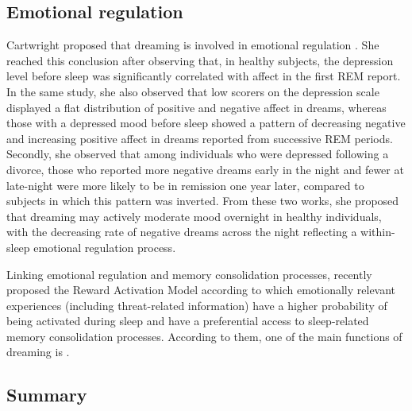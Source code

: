 \subsection{Emotional regulation}
\label{sec:dream-func:modern:emotion}

Cartwright proposed that dreaming is involved in emotional regulation \citep{cartwright_role_1998, cartwright_role_1998-1}. She reached this conclusion after observing that, in healthy subjects, the depression level before sleep was significantly correlated with affect in the first REM report. In the same study, she also observed that low scorers on the depression scale displayed a flat distribution of positive and negative affect in dreams, whereas those with a depressed mood before sleep showed a pattern of decreasing negative and increasing positive affect in dreams reported from successive REM periods. Secondly, she observed that among individuals who were depressed following a divorce, those who reported more negative dreams early in the night and fewer at late-night were more likely to be in remission one year later, compared to subjects in which this pattern was inverted. From these two works, she proposed that dreaming may actively moderate mood overnight in healthy individuals, with the decreasing rate of negative dreams across the night reflecting a within-sleep emotional regulation process.

Linking emotional regulation and memory consolidation processes, \citet{perogamvros_roles_2012} recently proposed the Reward Activation Model according to which emotionally relevant experiences (including threat-related information) have a higher probability of being activated during sleep and have a preferential access to sleep-related memory consolidation processes. According to them, one of the main functions of dreaming is  \citep{meerlo_sleep_2013}.

\subsection{Summary}
\label{sec:dream-func:modern:summary}


